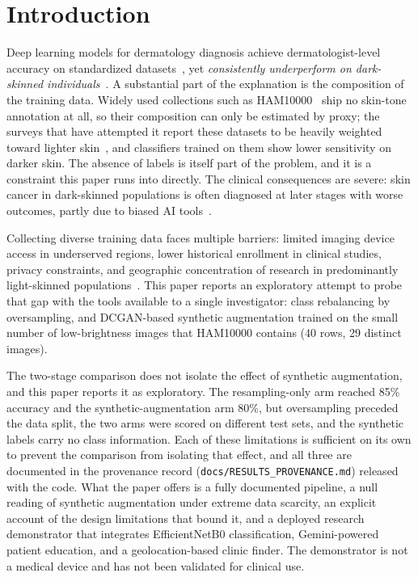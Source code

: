 \documentclass[ai,article,submit,pdftex,moreauthors]{Definitions/mdpi}
\begin{document}
\section{Introduction}

Deep learning models for dermatology diagnosis achieve dermatologist-level accuracy on standardized datasets~\cite{esteva2017, haenssle2018}, yet \textit{consistently underperform on dark-skinned individuals}~\cite{adamson2018, daneshjou2022}. A substantial part of the explanation is the composition of the training data. Widely used collections such as HAM10000~\cite{tschandl2018} ship no skin-tone annotation at all, so their composition can only be estimated by proxy; the surveys that have attempted it report these datasets to be heavily weighted toward lighter skin~\cite{kinyanjui2020, wen2022}, and classifiers trained on them show lower sensitivity on darker skin. The absence of labels is itself part of the problem, and it is a constraint this paper runs into directly. The clinical consequences are severe: skin cancer in dark-skinned populations is often diagnosed at later stages with worse outcomes, partly due to biased AI tools~\cite{agbai2014}.

Collecting diverse training data faces multiple barriers: limited imaging device access in underserved regions, lower historical enrollment in clinical studies, privacy constraints, and geographic concentration of research in predominantly light-skinned populations~\cite{wen2022}. This paper reports an exploratory attempt to probe that gap with the tools available to a single investigator: class rebalancing by oversampling, and DCGAN-based synthetic augmentation trained on the small number of low-brightness images that HAM10000 contains (40 rows, 29 distinct images).

The two-stage comparison does not isolate the effect of synthetic augmentation, and this paper reports it as exploratory. The resampling-only arm reached 85\% accuracy and the synthetic-augmentation arm 80\%, but oversampling preceded the data split, the two arms were scored on different test sets, and the synthetic labels carry no class information. Each of these limitations is sufficient on its own to prevent the comparison from isolating that effect, and all three are documented in the provenance record (\texttt{docs/RESULTS\_PROVENANCE.md}) released with the code. What the paper offers is a fully documented pipeline, a null reading of synthetic augmentation under extreme data scarcity, an explicit account of the design limitations that bound it, and a deployed research demonstrator that integrates EfficientNetB0 classification, Gemini-powered patient education, and a geolocation-based clinic finder. The demonstrator is not a medical device and has not been validated for clinical use.
\end{document}
